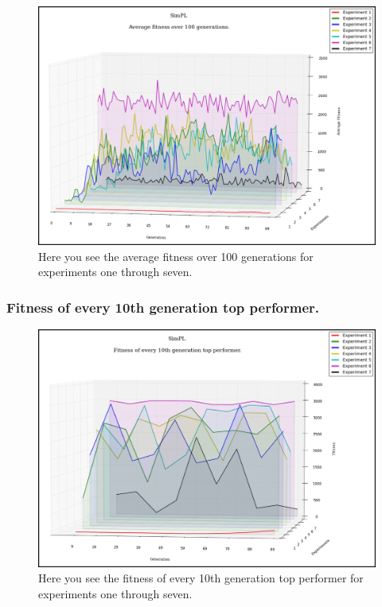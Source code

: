 \documentclass[a4paper,10pt]{article}
\begin{document}
\begin{figure}[H]  
  \centering
  \includegraphics[width=1\textwidth]{figures/all_avg_fit.png}
  \caption{Here you see the average fitness over 100 generations for experiments one through seven.}
  \label{fig:all_avg_fit}
\end{figure}

\subsubsection{Fitness of every 10th generation top performer.}

\begin{figure}[H]  
  \centering
  \includegraphics[width=1\textwidth]{figures/all_10_tops.png}
  \caption{Here you see the fitness of every 10th generation top performer for experiments one through seven.}
  \label{fig:all_10_tops}
\end{figure}
\end{document}
